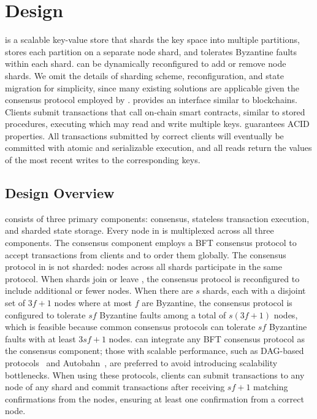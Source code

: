 \section{Design}
\label{sec:overview}

\sys is a scalable key-value store that shards the key space into multiple partitions, stores each partition on a separate node shard, and tolerates Byzantine faults within each shard.
\sys can be dynamically reconfigured to add or remove node shards.
We omit the details of sharding scheme, reconfiguration, and state migration for simplicity, since many existing solutions are applicable given the consensus protocol employed by \sys.
\sys provides an interface similar to blockchains.
Clients submit transactions that call on-chain smart contracts, similar to stored procedures, executing which may read and write multiple keys.
\sys guarantees ACID properties.
All transactions submitted by correct clients will eventually be committed with atomic and serializable execution, and all reads return the values of the most recent writes to the corresponding keys.

\subsection{Design Overview}

\sys consists of three primary components: consensus, stateless transaction execution, and sharded state storage.
Every node in \sys is multiplexed across all three components.
The consensus component employs a BFT consensus protocol to accept transactions from clients and to order them globally.
The consensus protocol in \sys is not sharded: nodes across all shards participate in the same protocol.
When shards join or leave \sys, the consensus protocol is reconfigured to include additional or fewer nodes.
When there are $s$ shards, each with a disjoint set of $3f+1$ nodes where at most $f$ are Byzantine, the consensus protocol is configured to tolerate $sf$ Byzantine faults among a total of $s(3f+1)$ nodes, which is feasible because common consensus protocols can tolerate $sf$ Byzantine faults with at least $3sf+1$ nodes.
\sys can integrate any BFT consensus protocol as the consensus component;
those with scalable performance, such as DAG-based protocols~\cite{bullshark} and Autobahn~\cite{giridharan2024autobahn}, are preferred to avoid introducing scalability bottlenecks.
When using these protocols, clients can submit transactions to any node of any shard and commit transactions after receiving $sf+1$ matching confirmations from the nodes, ensuring at least one confirmation from a correct node.

